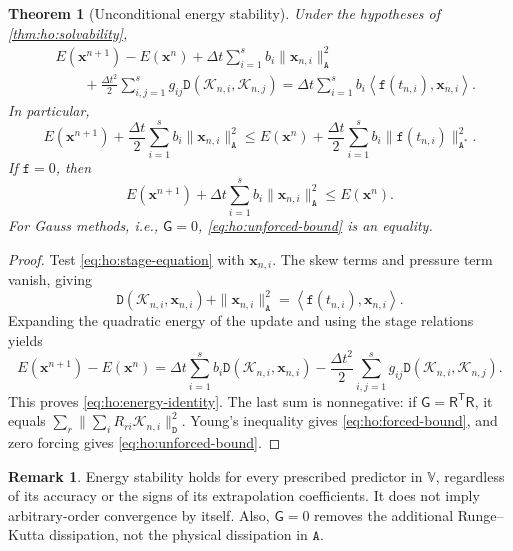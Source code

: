 \documentclass[11pt,a4paper]{article}
\newcommand{\bs}{\boldsymbol}
\newcommand{\dt}{\Delta t}
\newcommand{\V}{\mathbb V}
\newcommand{\DD}{\mathtt D}
\newcommand{\Aform}{\mathtt A}
\newcommand{\ff}{\mathtt f}
\newcommand{\dual}[2]{\left\langle#1,#2\right\rangle}
\newtheorem{theorem}{Theorem}[section]
\theoremstyle{definition}
\newtheorem{remark}[remark]{Remark}
\numberwithin{equation}{section}
\begin{document}

\begin{theorem}[Unconditional energy stability]\label{thm:ho:energy-solvability}
Under the hypotheses of \cref{thm:ho:solvability},
\begin{equation}\label{eq:ho:energy-identity}
\begin{aligned}
 &E(\bs x^{n+1})-E(\bs x^n)+\dt\sum_{i=1}^s b_i\|\bs x_{n,i}\|_{\Aform}^2\\
 &\qquad+\frac{\dt^2}{2}\sum_{i,j=1}^sg_{ij}
               \DD(\mathcal K_{n,i},\mathcal K_{n,j})
 =\dt\sum_{i=1}^s b_i\dual{\ff(t_{n,i})}{\bs x_{n,i}}.
\end{aligned}
\end{equation}
In particular,
\begin{equation}\label{eq:ho:forced-bound}
 E(\bs x^{n+1})+\frac{\dt}{2}\sum_{i=1}^s b_i\|\bs x_{n,i}\|_{\Aform}^2
 \le E(\bs x^n)+\frac{\dt}{2}\sum_{i=1}^s b_i\|\ff(t_{n,i})\|_{\Aform^*}^2.
\end{equation}
If $\ff=0$, then
\begin{equation}\label{eq:ho:unforced-bound}
 E(\bs x^{n+1})+\dt\sum_{i=1}^s b_i\|\bs x_{n,i}\|_{\Aform}^2\le E(\bs x^n).
\end{equation}
For Gauss methods, i.e., $\mathsf G=0$, \eqref{eq:ho:unforced-bound} is an equality.
\end{theorem}
\begin{proof}
Test \eqref{eq:ho:stage-equation} with $\bs x_{n,i}$. The skew terms and pressure
term vanish, giving
\[
 \DD(\mathcal K_{n,i},\bs x_{n,i})+\|\bs x_{n,i}\|_{\Aform}^2
 =\dual{\ff(t_{n,i})}{\bs x_{n,i}}.
\]
Expanding the quadratic energy of the update and using the stage relations yields
\begin{equation}\label{eq:ho:quadratic-identity}
 E(\bs x^{n+1})-E(\bs x^n)
 =\dt\sum_{i=1}^s b_i\DD(\mathcal K_{n,i},\bs x_{n,i})
 -\frac{\dt^2}{2}\sum_{i,j=1}^sg_{ij}\DD(\mathcal K_{n,i},\mathcal K_{n,j}).
\end{equation}
This proves \eqref{eq:ho:energy-identity}. The last sum is nonnegative:
if $\mathsf G=\mathsf R^{\mathsf T}\mathsf R$, it equals
$\sum_r\|\sum_iR_{ri}\mathcal K_{n,i}\|_{\DD}^2$.
Young's inequality gives \eqref{eq:ho:forced-bound}, and zero forcing gives
\eqref{eq:ho:unforced-bound}.
\end{proof}

\begin{remark}\label{rem:ho:stability-scope}
Energy stability holds for every prescribed predictor in $\V$, regardless of
its accuracy or the signs of its extrapolation coefficients. It does not imply
arbitrary-order convergence by itself. Also, $\mathsf G=0$ removes the additional
Runge--Kutta dissipation, not the physical dissipation in $\Aform$.
\end{remark}
\end{document}

